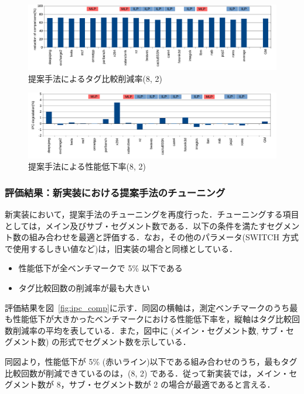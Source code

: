 \documentclass[twocolumn]{jsarticle}
\newcommand{\fig}[1]{{図~\ref{fig:#1}}}
\begin{document}
  \begin{figure}[ht]
    \centering
    \includegraphics[width=0.99\hsize]{comp.pdf}
    \caption{提案手法によるタグ比較削減率(8, 2)}  
    \label{fig:comp}
  \end{figure}

  \begin{figure}[ht]
    \centering
    \includegraphics[width=0.99\hsize]{ipc.pdf}
    \caption{提案手法による性能低下率(8, 2)}  
    \label{fig:ipc}
  \end{figure}
  \subsubsection{評価結果：新実装における提案手法のチューニング}
  新実装において，提案手法のチューニングを再度行った．チューニングする項目としては，メイン及びサブ・セグメント数である．以下の条件を満たすセグメント数の組み合わせを最適と評価する．なお，その他のパラメータ(SWITCH 方式で使用するしきい値など)は，旧実装の場合と同様としている．

  \begin{itemize}
    \item 性能低下が全ベンチマークで 5\% 以下である
    \item タグ比較回数の削減率が最も大きい
  \end{itemize}

  評価結果を\fig{ipc_comp}に示す．同図の横軸は，測定ベンチマークのうち最も性能低下が大きかったベンチマークにおける性能低下率を，縦軸はタグ比較回数削減率の平均を表している．また，図中に (メイン・セグメント数, サブ・セグメント数) の形式でセグメント数を示している．

  同図より，性能低下が 5\% (赤いライン)以下である組み合わせのうち，最もタグ比較回数が削減できているのは，(8, 2) である．従って新実装では，メイン・セグメント数が 8，サブ・セグメント数が 2 の場合が最適であると言える．
\end{document}
